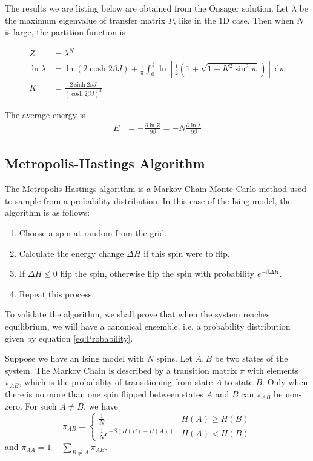 \documentclass[11pt]{article}
\newcommand{\vd}{\mathrm{d}} %
\begin{document}
	The results we are listing below are obtained from the Onsager solution\cite{onsager_solution}. Let $\lambda$ be the maximum eigenvalue of transfer matrix $P$, like in the 1D case. Then when $N$ is large, the partition function is

	\begin{equation}
		\begin{split}
			Z &= \lambda^N \\
			\ln{\lambda} &= \ln{\left(2 \cosh{2\beta J}\right)} + \frac{1}{\pi}\int_0^{\frac{\pi}{2}} \ln{\left[\frac{1}{2}\left(1 + \sqrt{1 - K^2\sin^2{w}}\right)\right]\;\vd w} \\
			K &= \frac{2\sinh{2\beta J}}{\left(\cosh{2\beta J}\right)^2}
		\end{split}
	\end{equation}
	
	The average energy is
	\begin{equation}
		\begin{split}
			E &= - \frac{\partial \ln{Z}}{\partial \beta} = -N\frac{\partial \ln{\lambda}}{\partial \beta}
		\end{split}
	\end{equation}

	\subsection{Metropolis-Hastings Algorithm}
	\label{metropolis_algorithm}
	
	The Metropolis-Hastings algorithm is a Markov Chain Monte Carlo method used to sample from a probability distribution. In this case of the Ising model, the algorithm is as follows:
	\begin{enumerate}
		\item Choose a spin at random from the grid.
		\item Calculate the energy change $\Delta H$ if this spin were to flip.
		\item If $\Delta H \leq 0$ flip the spin, otherwise flip the spin with probability $e^{-\beta\Delta H}$.
		\item Repeat this process.
	\end{enumerate}

	To validate the algorithm, we shall prove that when the system reaches equilibrium, we will have a canonical ensemble, i.e. a probability distribution given by equation \eqref{eq:Probability}.
	
	Suppose we have an Ising model with $N$ spins. Let $A, B$ be two states of the system. The Markov Chain is described by a transition matrix $\pi$ with elements $\pi_{AB}$, which is the probability of transitioning from state $A$ to state $B$. Only when there is no more than one spin flipped between states $A$ and $B$ can $\pi_{AB}$ be non-zero. For such $A \neq B$, we have
	\begin{equation}
		\pi_{AB} = \begin{cases}
			\frac{1}{N} & H(A) \geq H(B) \\
			\frac{1}{N} e^{-\beta(H(B) - H(A))} & H(A) < H(B)
		\end{cases}
	\end{equation}
	and $\pi_{AA} = 1 - \sum_{B \neq A} \pi_{AB}$.
\end{document}
